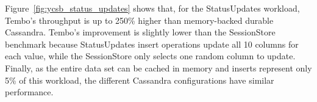  
Figure~\ref{fig:ycsb_status_updates} shows that, for the StatusUpdates
workload, Tembo's throughput is up to 250\% higher than memory-backed
durable Cassandra.  Tembo's improvement is slightly lower than the
SessionStore benchmark because StatusUpdates insert operations update all
10 columns for each value, while the SessionStore only selects one random
column to update.  Finally, as the entire data set can be cached in
memory and inserts represent only 5\% of this workload, the different
Cassandra configurations have similar performance.


